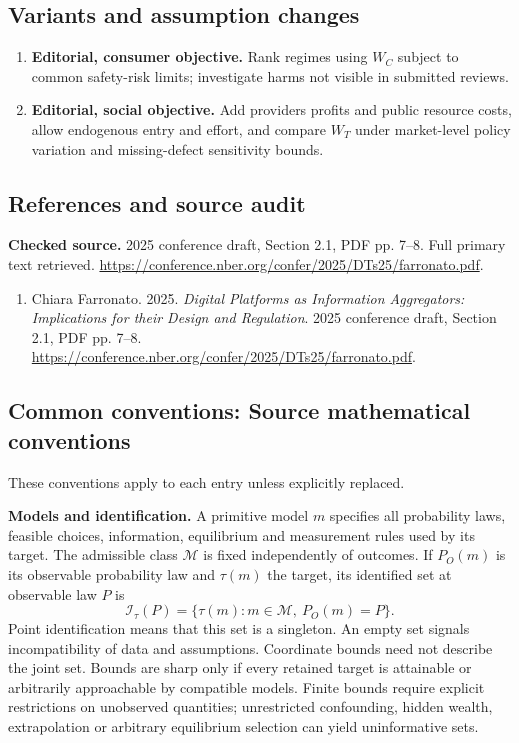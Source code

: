 \documentclass[11pt,a4paper]{article}
\begin{document}
\subsection*{Variants and assumption changes}
\begin{enumerate}
\item \textbf{Editorial, consumer objective.} Rank regimes using \(W_C\) subject to common safety-risk limits; investigate harms not visible in submitted reviews.
\item \textbf{Editorial, social objective.} Add providers profits and public resource costs, allow endogenous entry and effort, and compare \(W_T\) under market-level policy variation and missing-defect sensitivity bounds.
\end{enumerate}
\subsection*{References and source audit}
\textbf{Checked source.} 2025 conference draft, Section 2.1, PDF pp. 7--8. Full primary text retrieved. \url{https://conference.nber.org/confer/2025/DTs25/farronato.pdf}.
\begin{enumerate}\raggedright
\item\hypertarget{definitions:source:30007687:1}{} Chiara Farronato. 2025. \emph{Digital Platforms as Information Aggregators: Implications for their Design and Regulation}. 2025 conference draft, Section 2.1, PDF pp. 7--8.
\url{https://conference.nber.org/confer/2025/DTs25/farronato.pdf}.
\end{enumerate}

\subsection*{Common conventions: Source mathematical conventions}

These conventions apply to each entry unless explicitly replaced.

\textbf{Models and identification.} A primitive model \(m\) specifies all probability laws, feasible choices, information, equilibrium and measurement rules used by its target. The admissible class \(\mathcal M\) is fixed independently of outcomes. If \(P_O(m)\) is its observable probability law and \(\tau(m)\) the target, its identified set at observable law \(P\) is
\[
 \mathcal I_\tau(P)=\{\tau(m):m\in\mathcal M,\ P_O(m)=P\}.
\]
Point identification means that this set is a singleton. An empty set signals incompatibility of data and assumptions. Coordinate bounds need not describe the joint set. Bounds are sharp only if every retained target is attainable or arbitrarily approachable by compatible models. Finite bounds require explicit restrictions on unobserved quantities; unrestricted confounding, hidden wealth, extrapolation or arbitrary equilibrium selection can yield uninformative sets.
\end{document}
